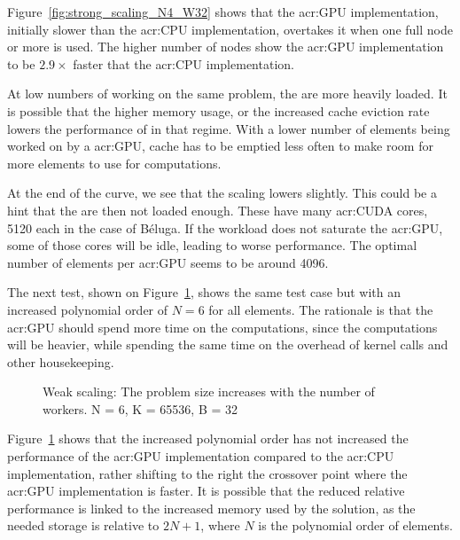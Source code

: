 Figure~\ref{fig:strong_scaling_N4_W32} shows that the \acrshort{acr:GPU} implementation, initially
slower than the \acrshort{acr:CPU} implementation, overtakes it when one full node or more is used.
The higher number of nodes show the \acrshort{acr:GPU} implementation to be \(2.9 \times \) faster
that the \acrshort{acr:CPU} implementation.

At low numbers of  working on the same problem, the  are
more heavily loaded. It is possible that the higher memory usage, or the increased cache eviction
rate lowers the performance of  in that regime. With a lower number of elements
being worked on by a \acrshort{acr:GPU}, cache has to be emptied less often to make room for more
elements to use for computations.

At the end of the curve, we see that the scaling lowers slightly. This could be a hint that the
 are then not loaded enough. These  have many
\acrshort{acr:CUDA} cores, 5120 each in the case of Béluga. If the workload does not saturate
the \acrshort{acr:GPU}, some of those cores will be idle, leading to worse performance. The optimal
number of elements per \acrshort{acr:GPU} seems to be around 4096.

The next test, shown on Figure~\ref{fig:strong_scaling_N6_W32}, shows the same test case but with an
increased polynomial order of \(N = 6\) for all elements. The rationale is that the
\acrshort{acr:GPU} should spend more time on the computations, since the computations will be
heavier, while spending the same time on the overhead of kernel calls and other housekeeping.

\begin{figure}[H]
	\centering
	
	\caption{Weak scaling: The problem size increases with the number of workers. N = 6, K = 65536, B = 32}\label{fig:strong_scaling_N6_W32}
\end{figure}

Figure~\ref{fig:strong_scaling_N6_W32} shows that the increased polynomial order has not increased
the performance of the \acrshort{acr:GPU} implementation compared to the \acrshort{acr:CPU}
implementation, rather shifting to the right the crossover point where the \acrshort{acr:GPU}
implementation is faster. It is possible that the reduced relative performance is linked to the
increased memory used by the solution, as the needed storage is relative to \(2 N + 1\), where \(N\)
is the polynomial order of elements.

